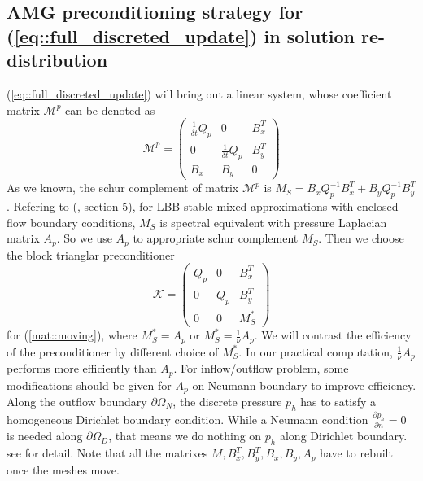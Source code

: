 \documentclass{eajam}
\begin{document}
   \subsection{AMG preconditioning strategy for
     (\ref{eq::full_discreted_update}) in solution re-distribution}
   (\ref{eq::full_discreted_update}) will bring out a linear
   system, whose coefficient matrix $\mathcal{M}^p$ can be denoted as
   \begin{equation}
     \mathcal{M}^p = 
     \left(
       \begin{array}{lll}
         \frac{1}{\delta t} Q_p & 0 & B_x^T \\
         0 & \frac{1}{\delta t} Q_p & B_y^T \\
         B_x & B_y & 0
       \end{array}
     \right)
     \label{mat::moving}
   \end{equation}
   As we known, the schur complement of matrix $\mathcal{M}^p$ is 
   $M_S = B_x Q_p^{-1} B_x^T + B_y Q_p^{-1} B_y^T$. Refering to
   (\cite{elman2005finite}, section 5), for LBB stable mixed
   approximations with enclosed flow boundary conditions, $M_S$ is
   spectral equivalent with pressure Laplacian matrix $A_p$. So we
   use $A_p$ to appropriate schur complement $M_S$. Then we
   choose the block trianglar preconditioner
   \begin{equation}
     \mathcal{K} =
     \left(
       \begin{array}{lll}
         Q_p & 0 & B_x^T \\
         0 & Q_p & B_y^T \\
         0 & 0 & M_S^* 
       \end{array}
     \right)
     \label{eq::updateSolution_precond}
   \end{equation}
   for (\ref{mat::moving}), where $M_S^* = A_p$ or $M_S^* =
   \frac{1}{\nu} A_p$. We will contrast the efficiency of the
   preconditioner by different choice of $M_S^*$.  In our
   practical computation, $\frac{1}{\nu}A_p$ performs more efficiently
   than $A_p$. For inflow/outflow problem, some modifications should
   be given for $A_p$ on Neumann boundary to improve efficiency. Along 
   the outflow boundary $\partial \Omega_N$, the discrete pressure $p_h$
   has to satisfy a homogeneous Dirichlet boundary condition. While
   a Neumann condition $\frac{\partial p_h}{\partial n} = 0$ is
   needed along $\partial \Omega_D$, that means we do nothing on
   $p_h$ along Dirichlet boundary. see \cite{elman2009boundary}
   for detail.
   Note that all the matrixes $M, B_x^T, B_y^T, B_x,
   B_y, A_p$ have to rebuilt once the meshes move. 
\end{document}
